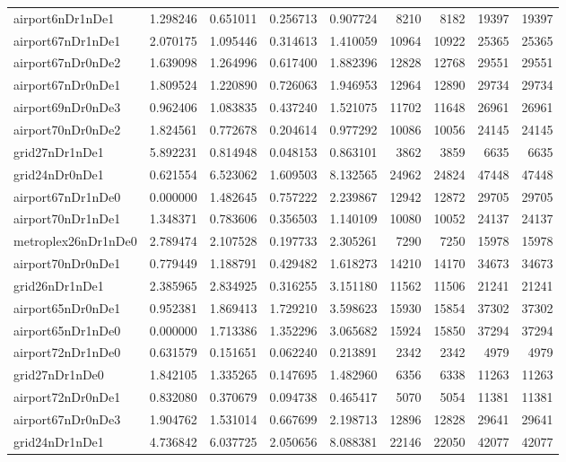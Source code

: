 \begin{longtable}{|l|r|r|r|r|r|r|r|r|}
airport6nDr1nDe1 & 1.298246 & 0.651011 & 0.256713 & 0.907724 & 8210 & 8182 & 19397 & 19397 \\
airport67nDr1nDe1 & 2.070175 & 1.095446 & 0.314613 & 1.410059 & 10964 & 10922 & 25365 & 25365 \\
airport67nDr0nDe2 & 1.639098 & 1.264996 & 0.617400 & 1.882396 & 12828 & 12768 & 29551 & 29551 \\
airport67nDr0nDe1 & 1.809524 & 1.220890 & 0.726063 & 1.946953 & 12964 & 12890 & 29734 & 29734 \\
airport69nDr0nDe3 & 0.962406 & 1.083835 & 0.437240 & 1.521075 & 11702 & 11648 & 26961 & 26961 \\
airport70nDr0nDe2 & 1.824561 & 0.772678 & 0.204614 & 0.977292 & 10086 & 10056 & 24145 & 24145 \\
grid27nDr1nDe1 & 5.892231 & 0.814948 & 0.048153 & 0.863101 & 3862 & 3859 & 6635 & 6635 \\
grid24nDr0nDe1 & 0.621554 & 6.523062 & 1.609503 & 8.132565 & 24962 & 24824 & 47448 & 47448 \\
airport67nDr1nDe0 & 0.000000 & 1.482645 & 0.757222 & 2.239867 & 12942 & 12872 & 29705 & 29705 \\
airport70nDr1nDe1 & 1.348371 & 0.783606 & 0.356503 & 1.140109 & 10080 & 10052 & 24137 & 24137 \\
metroplex26nDr1nDe0 & 2.789474 & 2.107528 & 0.197733 & 2.305261 & 7290 & 7250 & 15978 & 15978 \\
airport70nDr0nDe1 & 0.779449 & 1.188791 & 0.429482 & 1.618273 & 14210 & 14170 & 34673 & 34673 \\
grid26nDr1nDe1 & 2.385965 & 2.834925 & 0.316255 & 3.151180 & 11562 & 11506 & 21241 & 21241 \\
airport65nDr0nDe1 & 0.952381 & 1.869413 & 1.729210 & 3.598623 & 15930 & 15854 & 37302 & 37302 \\
airport65nDr1nDe0 & 0.000000 & 1.713386 & 1.352296 & 3.065682 & 15924 & 15850 & 37294 & 37294 \\
airport72nDr1nDe0 & 0.631579 & 0.151651 & 0.062240 & 0.213891 & 2342 & 2342 & 4979 & 4979 \\
grid27nDr1nDe0 & 1.842105 & 1.335265 & 0.147695 & 1.482960 & 6356 & 6338 & 11263 & 11263 \\
airport72nDr0nDe1 & 0.832080 & 0.370679 & 0.094738 & 0.465417 & 5070 & 5054 & 11381 & 11381 \\
airport67nDr0nDe3 & 1.904762 & 1.531014 & 0.667699 & 2.198713 & 12896 & 12828 & 29641 & 29641 \\
grid24nDr1nDe1 & 4.736842 & 6.037725 & 2.050656 & 8.088381 & 22146 & 22050 & 42077 & 42077 \\

\end{longtable}
